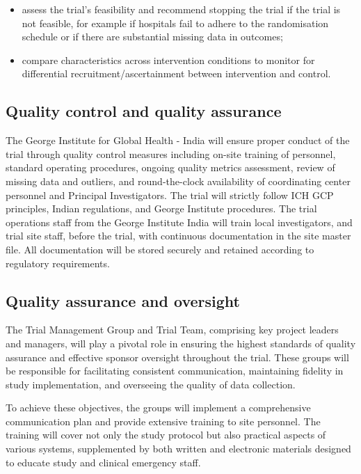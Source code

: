 \documentclass[
]{scrartcl}
\providecommand{\tightlist}{%
  \setlength{\itemsep}{0pt}\setlength{\parskip}{0pt}}\usepackage{longtable,booktabs,array}
\begin{document}
\begin{itemize}
\tightlist
\item
  assess the trial's feasibility and recommend stopping the trial if the
  trial is not feasible, for example if hospitals fail to adhere to the
  randomisation schedule or if there are substantial missing data in
  outcomes;
\item
  compare characteristics across intervention conditions to monitor for
  differential recruitment/ascertainment between intervention and
  control.
\end{itemize}

\hypertarget{quality-control-and-quality-assurance}{%
\subsection{Quality control and quality
assurance}\label{quality-control-and-quality-assurance}}

The George Institute for Global Health - India will ensure proper
conduct of the trial through quality control measures including on-site
training of personnel, standard operating procedures, ongoing quality
metrics assessment, review of missing data and outliers, and
round-the-clock availability of coordinating center personnel and
Principal Investigators. The trial will strictly follow ICH GCP
principles, Indian regulations, and George Institute procedures. The
trial operations staff from the George Institute India will train local
investigators, and trial site staff, before the trial, with continuous
documentation in the site master file. All documentation will be stored
securely and retained according to regulatory requirements.

\hypertarget{quality-assurance-and-oversight}{%
\subsection{Quality assurance and
oversight}\label{quality-assurance-and-oversight}}

The Trial Management Group and Trial Team, comprising key project
leaders and managers, will play a pivotal role in ensuring the highest
standards of quality assurance and effective sponsor oversight
throughout the trial. These groups will be responsible for facilitating
consistent communication, maintaining fidelity in study implementation,
and overseeing the quality of data collection.

To achieve these objectives, the groups will implement a comprehensive
communication plan and provide extensive training to site personnel. The
training will cover not only the study protocol but also practical
aspects of various systems, supplemented by both written and electronic
materials designed to educate study and clinical emergency staff.
\end{document}
